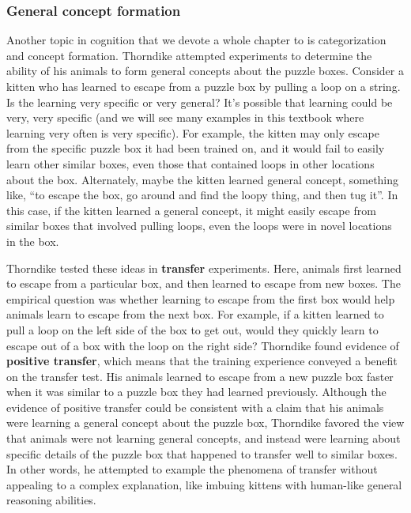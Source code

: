 \documentclass[
  oneside,
  12pt]{crumpbook}
\begin{document}
\hypertarget{general-concept-formation}{%
\subsubsection{General concept formation}\label{general-concept-formation}}

Another topic in cognition that we devote a whole chapter to is categorization and concept formation. Thorndike attempted experiments to determine the ability of his animals to form general concepts about the puzzle boxes. Consider a kitten who has learned to escape from a puzzle box by pulling a loop on a string. Is the learning very specific or very general? It's possible that learning could be very, very specific (and we will see many examples in this textbook where learning very often is very specific). For example, the kitten may only escape from the specific puzzle box it had been trained on, and it would fail to easily learn other similar boxes, even those that contained loops in other locations about the box. Alternately, maybe the kitten learned general concept, something like, ``to escape the box, go around and find the loopy thing, and then tug it''. In this case, if the kitten learned a general concept, it might easily escape from similar boxes that involved pulling loops, even the loops were in novel locations in the box.

Thorndike tested these ideas in \textbf{transfer} experiments. Here, animals first learned to escape from a particular box, and then learned to escape from new boxes. The empirical question was whether learning to escape from the first box would help animals learn to escape from the next box. For example, if a kitten learned to pull a loop on the left side of the box to get out, would they quickly learn to escape out of a box with the loop on the right side? Thorndike found evidence of \textbf{positive transfer}, which means that the training experience conveyed a benefit on the transfer test. His animals learned to escape from a new puzzle box faster when it was similar to a puzzle box they had learned previously. Although the evidence of positive transfer could be consistent with a claim that his animals were learning a general concept about the puzzle box, Thorndike favored the view that animals were not learning general concepts, and instead were learning about specific details of the puzzle box that happened to transfer well to similar boxes. In other words, he attempted to example the phenomena of transfer without appealing to a complex explanation, like imbuing kittens with human-like general reasoning abilities.
\end{document}
